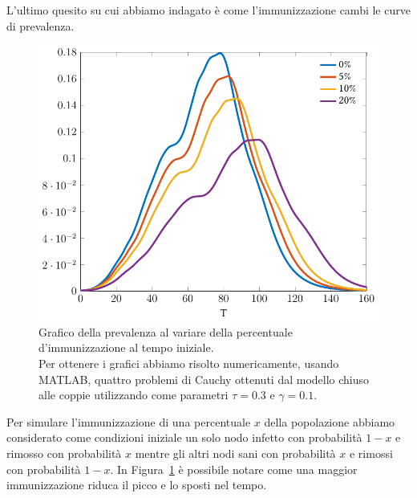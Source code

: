 L'ultimo quesito su cui abbiamo indagato \`e come l'immunizzazione cambi le curve di prevalenza.
\begin{figure}[htbp]
\centering
\includegraphics{Figure/minnesota_immunizzazione}
%
\caption[Grafico della prevalenza al variare della percentuale d'immunizzazione.]{Grafico della prevalenza al variare della percentuale d'immunizzazione al tempo iniziale.\\ Per ottenere i grafici abbiamo risolto numericamente, usando MATLAB, quattro problemi di Cauchy ottenuti dal modello chiuso alle coppie utilizzando come parametri $\tau=0.3$ e $\gamma=0.1$.}
\label{fig::minnesota_immunizzato}
\end{figure}
Per simulare l'immunizzazione di una percentuale $x$  della popolazione abbiamo considerato come condizioni iniziale un solo nodo infetto con probabilit\`a $1-x$ e rimosso con probabilit\`a $x$ mentre gli altri nodi sani con probabilit\`a $x$ e rimossi con probabilit\`a $1-x$.
In Figura~\ref{fig::minnesota_immunizzato} \`e possibile notare come una maggior immunizzazione riduca il picco e lo sposti nel tempo.
